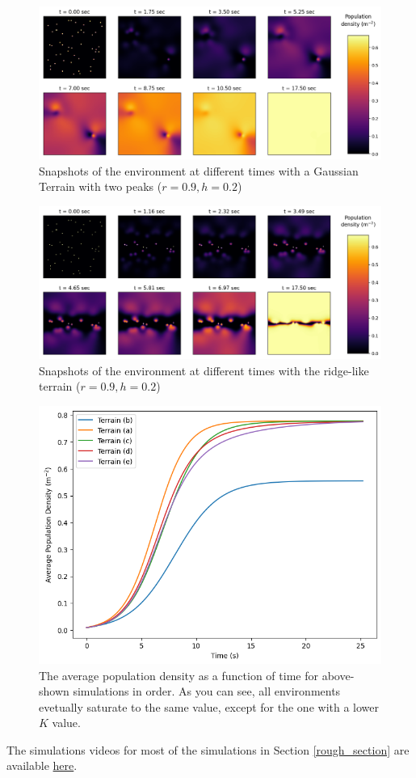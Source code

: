 \begin{figure}[H]
    \centering
    \includegraphics[width=1\linewidth]{Figures/5/5c/terrain3_spread.png}
    \caption{Snapshots of the environment at different times with a Gaussian Terrain with two peaks ($r=0.9,h=0.2$)}
\end{figure}

\begin{figure}[H]
    \centering
    \includegraphics[width=1\linewidth]{Figures/5/5c/terrain4_spread.png}
    \caption{Snapshots of the environment at different times with the ridge-like terrain ($r=0.9,h=0.2$)}
\end{figure}


\begin{figure}[H]
    \centering
    \includegraphics[width=0.5\linewidth]{Figures/5/5c/densities.png}
    \caption{The average population density as a function of time for above-shown simulations in order. As you can see, all environments evetually saturate to the same value, except for the one with a lower $K$ value.}
\end{figure}


The simulations videos for most of the simulations in Section \ref{rough_section} are available \href{https://gayatri-p.github.io/p346-computational-physics/hunting3.html#simulation-for-each-terrain}{here}.

